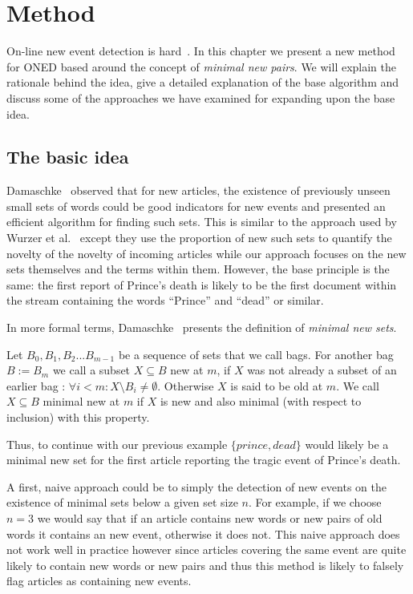 \chapter{Method}
\label{chapter:method}
On-line new event detection is hard~\cite{allan2000hard}. In this chapter we present a new method for ONED based around the concept of \emph{minimal new pairs}. We will explain the rationale behind the idea, give a detailed explanation of the base algorithm and discuss some of the approaches we have examined for expanding upon the base idea.


\section{The basic idea}
\label{section:idea}
Damaschke~\cite{damaschke2015pairs} observed that for new articles, the existence of previously unseen small sets of words could be good indicators for new events and presented an efficient algorithm for finding such sets. This is similar to the approach used by Wurzer et al.~\cite{wurzer2015kterm} except they use the proportion of new such sets to quantify the novelty of the novelty of incoming articles while our approach focuses on the new sets themselves and the terms within them. However, the base principle is the same: the first report of Prince's death is likely to be the first document within the stream containing the words ``Prince'' and ``dead'' or similar. 

In more formal terms, Damaschke~\cite{damaschke2015pairs} presents the definition of \emph{minimal new sets}. 

\begin{definition}
  Let $B_0, B_1, B_2...B_{m-1}$ be a sequence of sets that we call bags. For another bag $B:=B_{m}$ we call a subset $X \subseteq B$ new at $m$, if $X$ was not already a subset of an earlier bag : $\forall i < m : X \setminus B_{i} \neq \emptyset$. Otherwise $X$ is said to be old at $m$. We call $X \subseteq B$ minimal new at $m$ if $X$ is new and also minimal (with respect to inclusion) with this property.
\end{definition}

Thus, to continue with our previous example $\{prince, dead\}$ would likely be a minimal new set for the first article reporting the tragic event of Prince's death.

A first, naive approach could be to simply the detection of new events on the existence of minimal sets below a given set size $n$. For example, if we choose $n=3$ we would say that if an article contains new words or new pairs of old words it contains an new event, otherwise it does not. This naive approach does not work well in practice however since articles covering the same event are quite likely to contain new words or new pairs and thus this method is likely to falsely flag articles as containing new events.

